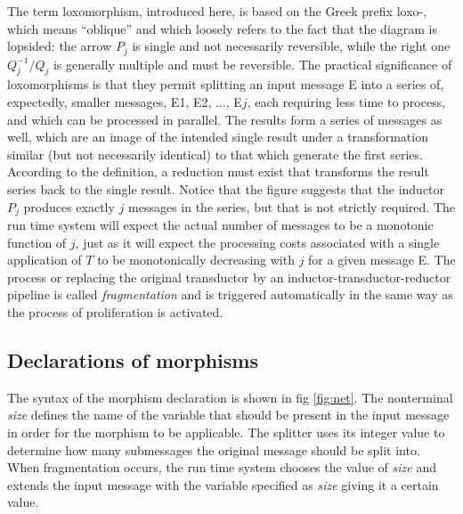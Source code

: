 \documentclass[11pt]{report}
\begin{document}
The term loxomorphism, introduced here, is based on the Greek prefix loxo-, which means ``oblique'' and
which loosely refers to the fact that the diagram is lopsided:
the arrow $P_j$ is single and not necessarily reversible,
while the right one $Q^{-1}_j/Q_j$ is generally multiple and must be reversible.
The practical significance of loxomorphisms is that they permit splitting an input message E into a series of, expectedly, smaller messages, E1, E2, $\ldots$, E$j$, 
each requiring less time
to process, and which can be processed in parallel. The results form a series of messages as well, which are an image of the
intended single result under a transformation similar (but not necessarily identical)  to that which generate the first series. According to the definition, a reduction
must exist that transforms the result series back to the single result. Notice that the figure suggests that the inductor $P_j$ produces exactly $j$ messages
in the series, but that is not strictly required. The run time system will expect the actual number of messages to be a monotonic function of $j$, just as it will expect
the processing costs associated with a single application of $T$ to be monotonically decreasing with $j$ for a given message E. The process or replacing
the original transductor by an inductor-transductor-reductor pipeline is called {\em fragmentation} and is triggered automatically in the same way as the
process of proliferation is activated. 

\subsection{Declarations of morphisms}

The syntax of the morphism declaration is shown in fig \ref{fig:net}. The nonterminal {\it size} defines the name of the variable that should be present
in the input message in order for the morphism to be applicable. The splitter uses its integer value to determine how many submessages the original message
should be split into. When fragmentation occurs, the run time system chooses the value of {\it size} and extends the input message with the variable specified 
as {\em size} giving it a certain value.   
\end{document}
